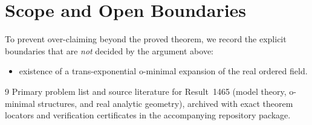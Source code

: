 \documentclass[10pt,reqno]{amsart}
\theoremstyle{definition}
\begin{document}
\section{Scope and Open Boundaries}

To prevent over-claiming beyond the proved theorem, we record the explicit boundaries that are \emph{not} decided by the argument above:
\begin{itemize}
  \item existence of a trans-exponential o-minimal expansion of the real ordered field.
\end{itemize}

\begin{thebibliography}{9}
Primary problem list and source literature for Result~1465 (model theory, o-minimal structures, and real analytic geometry), archived with exact theorem locators and verification certificates in the accompanying repository package.
\end{thebibliography}
\end{document}
